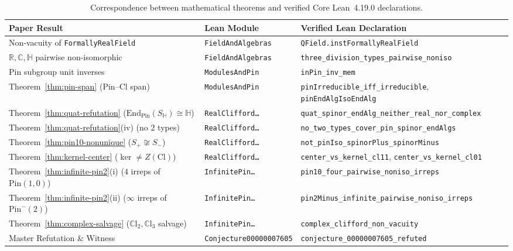 \documentclass[11pt,a4paper]{article}
\theoremstyle{plain}
\theoremstyle{definition}
\newcommand{\Cl}{\mathrm{Cl}}
\newcommand{\CCl}{\mathbb{C}\mathrm{l}}
\newcommand{\Pin}{\mathrm{Pin}}
\newcommand{\End}{\mathrm{End}}
\newcommand{\R}{\mathbb{R}}
\newcommand{\C}{\mathbb{C}}
\newcommand{\HH}{\mathbb{H}}
\begin{document}
\begin{table}[ht]
\centering
\footnotesize
\setlength{\tabcolsep}{4pt}
\begin{tabular}{>{\raggedright\arraybackslash}p{4.0cm}>{\raggedright\arraybackslash}p{3.6cm}>{\raggedright\arraybackslash}p{7.4cm}}
\hline
\textbf{Paper Result} & \textbf{Lean Module} & \textbf{Verified Lean Declaration} \\
\hline
Non-vacuity of \texttt{FormallyRealField} & \texttt{FieldAndAlgebras} & \texttt{QField.instFormallyRealField} \\
$\R, \C, \HH$ pairwise non-isomorphic & \texttt{FieldAndAlgebras} & \texttt{three\_division\_types\_pairwise\_noniso} \\
$\Pin$ subgroup unit inverses & \texttt{ModulesAndPin} & \texttt{inPin\_inv\_mem} \\
Theorem~\ref{thm:pin-span} ($\Pin$--$\Cl$ span) & \texttt{ModulesAndPin} & \texttt{pinIrreducible\_iff\_irreducible}, \texttt{pinEndAlgIsoEndAlg} \\
Theorem~\ref{thm:quat-refutation} ($\End_{\Pin}(S_{\HH}) \cong \HH$) & \texttt{RealClifford\dots} & \texttt{quat\_spinor\_endAlg\_neither\_real\_nor\_complex} \\
Theorem~\ref{thm:quat-refutation}(iv) (no 2 types) & \texttt{RealClifford\dots} & \texttt{no\_two\_types\_cover\_pin\_spinor\_endAlgs} \\
Theorem~\ref{thm:pin10-nonunique} ($S_+ \not\cong S_-$) & \texttt{RealClifford\dots} & \texttt{not\_pinIso\_spinorPlus\_spinorMinus} \\
Theorem~\ref{thm:kernel-center} ($\ker \neq Z(\Cl)$) & \texttt{RealClifford\dots} & \texttt{center\_vs\_kernel\_cl11}, \texttt{center\_vs\_kernel\_cl01} \\
Theorem~\ref{thm:infinite-pin2}(i) ($4$ irreps of $\Pin(1,0)$) & \texttt{InfinitePin\dots} & \texttt{pin10\_four\_pairwise\_noniso\_irreps} \\
Theorem~\ref{thm:infinite-pin2}(ii) ($\infty$ irreps of $\Pin^-(2)$) & \texttt{InfinitePin\dots} & \texttt{pin2Minus\_infinite\_pairwise\_noniso\_irreps} \\
Theorem~\ref{thm:complex-salvage} ($\CCl_2, \CCl_3$ salvage) & \texttt{InfinitePin\dots} & \texttt{complex\_clifford\_non\_vacuity} \\
Master Refutation \& Witness & \texttt{Conjecture00000007605} & \texttt{conjecture\_00000007605\_refuted} \\
\hline
\end{tabular}
\caption{Correspondence between mathematical theorems and verified Core Lean~4.19.0 declarations.}
\label{tab:lean-map}
\end{table}
\end{document}
